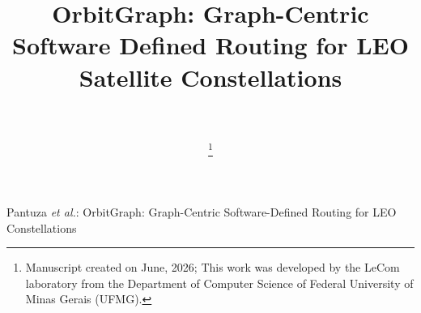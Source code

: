 \documentclass[lettersize,journal]{IEEEtran}
\begin{document}
\title{OrbitGraph: Graph-Centric Software Defined Routing for LEO Satellite Constellations}

\author{\\


\thanks{Manuscript created on June, 2026; This work was developed by the LeCom laboratory from the Department of Computer Science of Federal University of Minas Gerais (UFMG).}
}

%
{Pantuza \MakeLowercase{\textit{et al.}}: OrbitGraph: Graph-Centric Software-Defined Routing for LEO Constellations}

\maketitle

















\end{document}
